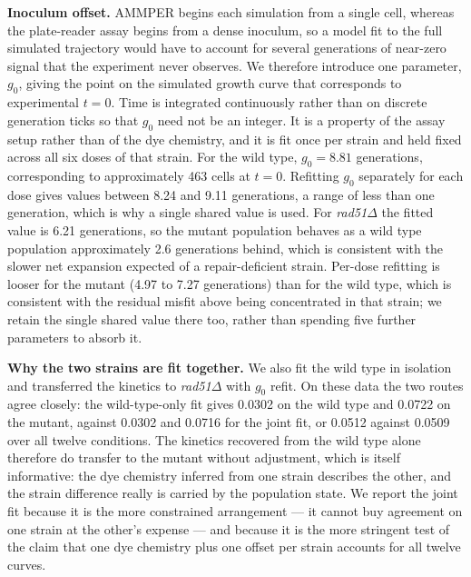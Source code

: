 \documentclass[11pt]{article}
\begin{document}
\textbf{Inoculum offset.} AMMPER begins each simulation from a single cell,
whereas the plate-reader assay begins from a dense inoculum, so a model fit to
the full simulated trajectory would have to account for several generations of
near-zero signal that the experiment never observes. We therefore introduce one
parameter, $g_0$, giving the point on the simulated growth curve that corresponds
to experimental $t = 0$. Time is integrated continuously rather than on discrete
generation ticks so that $g_0$ need not be an integer. It is a property of the
assay setup rather than of the dye chemistry, and it is fit once per strain and
held fixed across all six doses of that strain. For the wild type, $g_0 = 8.81$
generations, corresponding to approximately 463 cells at $t = 0$. Refitting $g_0$
separately for each dose gives values between 8.24 and 9.11 generations, a range
of less than one generation, which is why a single shared value is used. For
\textit{rad51}$\Delta$ the fitted value is 6.21 generations, so the mutant
population behaves as a wild type population approximately 2.6 generations
behind, which is consistent with the slower net expansion expected of a
repair-deficient strain. Per-dose refitting is looser for the mutant (4.97 to
7.27 generations) than for the wild type, which is consistent with the residual
misfit above being concentrated in that strain; we retain the single shared value
there too, rather than spending five further parameters to absorb it.

\textbf{Why the two strains are fit together.} We also fit the wild type in
isolation and transferred the kinetics to \textit{rad51}$\Delta$ with $g_0$ refit.
On these data the two routes agree closely: the wild-type-only fit gives 0.0302 on
the wild type and 0.0722 on the mutant, against 0.0302 and 0.0716 for the joint
fit, or 0.0512 against 0.0509 over all twelve conditions. The kinetics recovered
from the wild type alone therefore do transfer to the mutant without adjustment,
which is itself informative: the dye chemistry inferred from one strain describes
the other, and the strain difference really is carried by the population state. We
report the joint fit because it is the more constrained arrangement --- it cannot
buy agreement on one strain at the other's expense --- and because it is the more
stringent test of the claim that one dye chemistry plus one offset per strain
accounts for all twelve curves.
\end{document}
